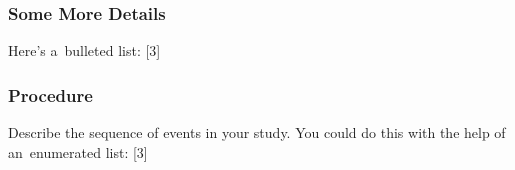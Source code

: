 \subsubsection{Some More Details}
\blindtext

Here's a~bulleted list:
[3]

\subsubsection{Procedure}
\label{sec:Procedure}
Describe the sequence of events in your study. You could do this with the help of an~enumerated list:
[3]
